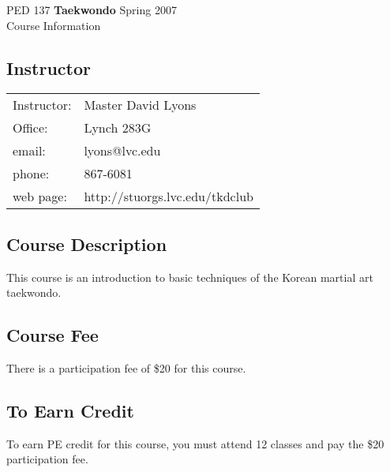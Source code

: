 \documentclass[11pt]{article}
\begin{document}
\thispagestyle{empty}

\vspace*{-.5in}
  \begin{center}
    {\Large PED 137 {\bf Taekwondo}  Spring 2007}\\{\Large Course Information}
  \end{center}

\vspace*{-3ex}
\subsection*{Instructor}

\vspace*{-1ex}
\begin{tabular}
  {ll}
Instructor: &    Master David Lyons\\
Office:      &   Lynch 283G\\
email:       &   lyons@lvc.edu\\
phone:       &   867-6081\\
web page:    &   http://stuorgs.lvc.edu/tkdclub 
\end{tabular}

\vspace*{-3ex}
\subsection*{Course Description}
\vspace*{-1ex}

 This course is an introduction to basic techniques of the Korean martial art taekwondo.

\vspace*{-3ex}
\subsection*{Course Fee}
\vspace*{-1ex}

There is a participation fee of \$20 for this course.

\vspace*{-3ex}
\subsection*{To Earn Credit}
\vspace*{-1ex}

To earn PE credit for this course, you must attend 12 classes and pay the \$20 participation fee.
\end{document}

